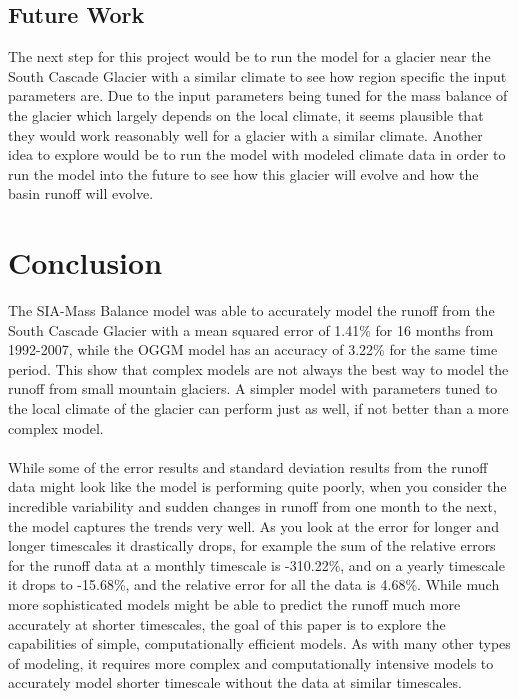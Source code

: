 \documentclass{article}
\begin{document}
\subsection{Future Work}
The next step for this project would be to run the model for a glacier near the South Cascade Glacier with a similar climate to see how region specific the input 
parameters are. Due to the input parameters being tuned for the mass balance of the glacier which largely depends on the local climate, it 
seems plausible that they would work reasonably well for a glacier with a similar climate.
Another idea to explore would be to run the model with modeled climate data in order to run the model into the future to see how this glacier 
will evolve and how the basin runoff will evolve.
\section{Conclusion}
The SIA-Mass Balance model was able to accurately model the runoff from the South Cascade Glacier with a mean squared error of 1.41\% for 16 
months from 1992-2007, while the OGGM model has an accuracy of 3.22\% for the same time period. This show that complex models are not always 
the best way to model the runoff from small mountain glaciers. A simpler model with parameters tuned to the local climate of the glacier can 
perform just as well, if not better than a more complex model. 
\paragraph{}
While some of the error results and standard deviation results from the runoff data might look like the model is performing quite poorly, 
when you consider the incredible variability and sudden changes in runoff from one month to the next, the model captures the trends very well. 
As you look at the error for longer and longer timescales it drastically drops, for example the sum of the relative errors for the runoff 
data at a monthly timescale is -310.22\%, and on a yearly timescale it drops to -15.68\%, and the relative error for all the data is 4.68\%.
While much more sophisticated models might be able to predict the runoff much more accurately at shorter timescales, the goal of this paper 
is to explore the capabilities of simple, computationally efficient models. As with many other types of modeling, it requires more complex 
and computationally intensive models to accurately model shorter timescale without the data at similar timescales. 
\end{document}
